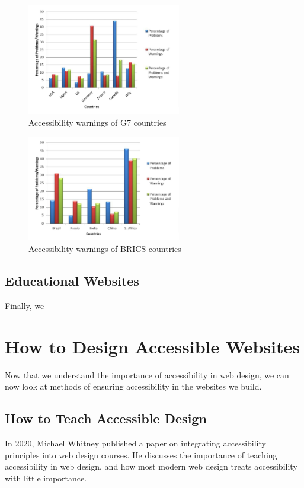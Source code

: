\documentclass{article}
\begin{document}
\begin{figure}
	\centering
	\includegraphics[width=0.6\textwidth]{images/governmentgraph1.png}
	\caption{Accessibility warnings of G7 countries \cite{Government}}
	\label{fig:gseven}
\end{figure}

\begin{figure}
	\centering
	\includegraphics[width=0.6\textwidth]{images/governmentgraph2.png}
	\caption{Accessibility warnings of BRICS countries \cite{Government}}
	\label{fig:brics}
\end{figure}

\subsection{Educational Websites}
Finally, we 


\section{How to Design Accessible Websites}
Now that we understand the importance of accessibility in web design, we can now look at methods of ensuring accessibility in the websites we build.

\subsection{How to Teach Accessible Design}
In 2020, Michael Whitney published a paper on integrating accessibility principles into web design courses.
He discusses the importance of teaching accessibility in web design, and how most modern web design treats accessibility with little importance.
\cite{Learning}
\end{document}
